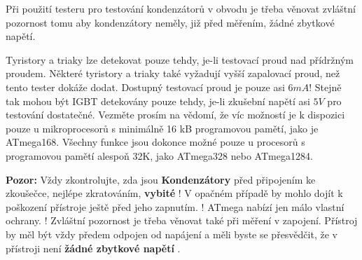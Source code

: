  Při použití testeru pro testování kondenzátorů v obvodu je třeba věnovat zvláštní pozornost tomu
  aby kondenzátory neměly, již před měřením, žádné zbytkové napětí.

Tyristory a triaky lze detekovat pouze tehdy, je-li testovací proud nad přídržným proudem.
Některé tyristory a triaky také vyžadují vyšší zapalovací proud, než tento tester dokáže dodat.
Dostupný testovací proud je pouze asi \(6mA\)!
Stejně tak mohou být IGBT detekovány pouze tehdy, je-li zkušební napětí asi \(5V\) pro testování dostatečné.
Vezměte prosím na vědomí, že víc možností je k dispozici pouze u mikroprocesorů s minimálně 16 kB programovou pamětí, jako je ATmega168. 
Všechny funkce jsou dokonce možné pouze u procesorů s programovou pamětí alespoň 32K, jako ATmega328 nebo ATmega1284.

\vspace{1cm}
\textbf{{\Large Pozor:}} Vždy zkontrolujte, zda jsou {\bf Kondenzátory}  před připojením ke zkoušečce,
nejlépe zkratováním, {\bf vybité} !
V opačném případě by mohlo dojít k poškození přístroje ještě před jeho zapnutím.
! ATmega nabízí jen málo vlastní ochrany. !
Zvláštní pozornost je třeba věnovat také při měření v zapojení.
Přístroj by měl být vždy předem odpojen od napájení a měli byste se přesvědčit, že v přístroji není {\bf žádné zbytkové napětí} .
